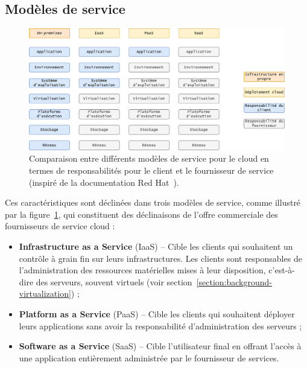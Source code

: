 \subsection{Modèles de service}

\begin{figure}[!ht]
    \centering
	\includegraphics[width=\textwidth]{2_Chapitre2/figures/service-models.png}
	\caption[Comparaison entre différents modèles de service pour le cloud en termes de responsabilités pour le client et le fournisseur de service.]{Comparaison entre différents modèles de service pour le cloud en termes de responsabilités pour le client et le fournisseur de service (inspiré de la documentation Red Hat~{\protect \footnotemark}).}
	\label{figure:context-service-model}
\end{figure}


Ces caractéristiques sont déclinées dans trois modèles de service, comme illustré par la figure~\ref{figure:context-service-model}, qui constituent des déclinaisons de l'offre commerciale des fournisseurs de service cloud :

\begin{itemize}
    \item \textbf{Infrastructure as a Service} (\gls{IaaS}) -- Cible les clients qui souhaitent un contrôle à grain fin sur leurs infrastructures. Les clients sont responsables de l'administration des ressources matérielles mises à leur disposition, c'est-à-dire des serveurs, souvent virtuels (voir section~\ref{section:background-virtualization}) ;
    \item \textbf{Platform as a Service} (\gls{PaaS}) -- Cible les clients qui souhaitent déployer leurs applications sans avoir la responsabilité d'administration des serveurs ;
    \item \textbf{Software as a Service} (\gls{SaaS}) -- Cible l'utilisateur final en offrant l'accès à une application entièrement administrée par le fournisseur de services.
\end{itemize}

